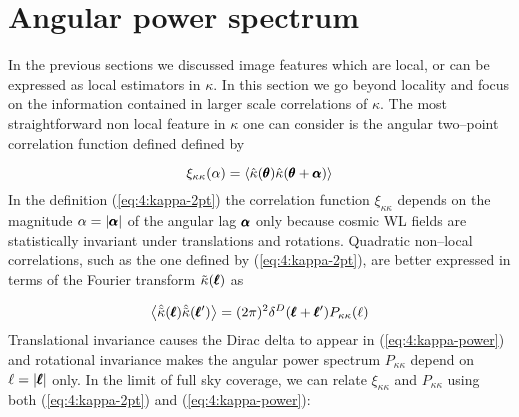 
\section{Angular power spectrum}
\label{sec:4:power}
In the previous sections we discussed image features which are local, or can be expressed as local estimators in $\kappa$. In this section we go beyond locality and focus on the information contained in larger scale correlations of $\kappa$. The most straightforward non local feature in $\kappa$ one can consider is the angular two--point correlation function defined defined by 

\begin{equation}
\label{eq:4:kappa-2pt}
\xi_{\kappa\kappa}(\alpha) = \langle\hat{\kappa}(\pmb{\theta})\hat{\kappa}(\pmb{\theta}+\pmb{\alpha})\rangle 
\end{equation} 
%
In the definition (\ref{eq:4:kappa-2pt}) the correlation function $\xi_{\kappa\kappa}$ depends on the magnitude $\alpha=\vert\pmb{\alpha}\vert$ of the angular lag $\pmb{\alpha}$ only because cosmic WL fields are statistically invariant under translations and rotations. Quadratic non--local correlations, such as the one defined by (\ref{eq:4:kappa-2pt}), are better expressed in terms of the Fourier transform $\tilde{\kappa}(\pmb{\ell})$ as

\begin{equation}
\label{eq:4:kappa-power}
\left\langle\hat{\tilde{\kappa}}(\pmb{\ell})\hat{\tilde{\kappa}}(\pmb{\ell}')\right\rangle = (2\pi)^2 \delta^D(\pmb{\ell}+\pmb{\ell}')P_{\kappa\kappa}(\ell)
\end{equation}
%
Translational invariance causes the Dirac delta to appear in (\ref{eq:4:kappa-power}) and rotational invariance makes the angular power spectrum $P_{\kappa\kappa}$ depend on $\ell=\vert\pmb{\ell}\vert$ only. In the limit of full sky coverage, we can relate $\xi_{\kappa\kappa}$ and $P_{\kappa\kappa}$ using both (\ref{eq:4:kappa-2pt}) and (\ref{eq:4:kappa-power}):  

